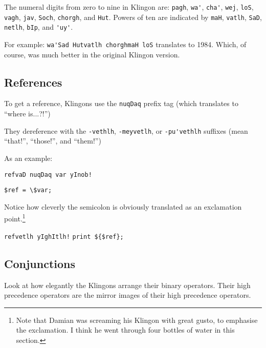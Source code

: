 \documentclass{article}
\begin{document}
The numeral digits from zero to nine in Klingon are:
\verb"pagh", \verb"wa'", \verb"cha'", \verb"wej", \verb"loS",
\verb"vagh", \verb"jav", \verb"Soch", \verb"chorgh", and \verb"Hut".  
Powers of ten are indicated by \verb"maH", \verb"vatlh", \verb"SaD", 
\verb"netlh", \verb"bIp", and \verb"'uy'".

For example:
\verb"wa'Sad Hutvatlh chorghmaH loS" translates to
1984.  Which, of course, was much better in the original Klingon version.

\subsection{References}
To get a reference, Klingons use the \verb"nuqDaq" prefix tag 
(which translates to ``where is...?!'')

They dereference with the \verb"-vethlh", \verb"-meyvetlh", or 
\verb"-pu'vethlh" suffixes (mean ``that!'', ``those!'', and ``them!'')

\noindent As an example:

\verb"refvaD nuqDaq var yInob!"

\verb"$ref = \$var;"

\noindent Notice how cleverly the semicolon is obviously translated as an
exclamation point.\footnote{Note that Damian was screaming his Klingon 
with great gusto, to emphasise the exclamation.  I think he went through 
four bottles of water in this section.}

\verb"refvetlh yIghItlh!"
\verb"print ${$ref};"

\subsection{Conjunctions}
Look at how elegantly the Klingons arrange their binary operators.
Their high precedence operators are the mirror images of their high
precedence operators.
\end{document}
